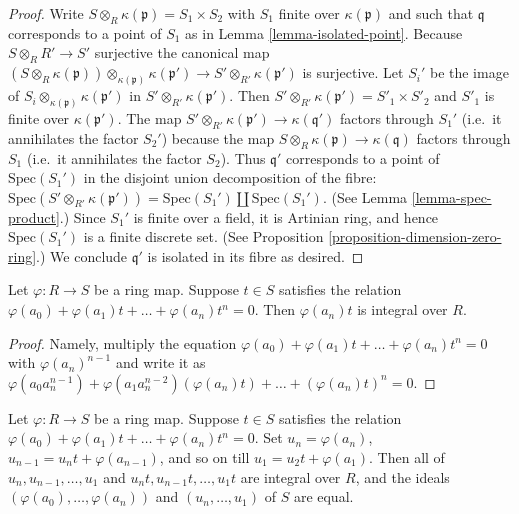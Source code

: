 \begin{proof}
Write $S \otimes_R \kappa(\mathfrak p) = S_1 \times S_2$
with $S_1$ finite over $\kappa(\mathfrak p)$ and such that
$\mathfrak q$ corresponds to a point of $S_1$ as in
Lemma \ref{lemma-isolated-point}.
Because $S \otimes_R R' \to S'$ surjective the canonical map
$(S \otimes_R \kappa(\mathfrak p)) \otimes_{\kappa(\mathfrak p)}
\kappa(\mathfrak p') \to S' \otimes_{R'} \kappa(\mathfrak p')$
is surjective. Let $S_i'$ be the image of $S_i \otimes_{\kappa(\mathfrak p)}
\kappa(\mathfrak p')$ in $S' \otimes_{R'} \kappa(\mathfrak p')$.
Then $S' \otimes_{R'} \kappa(\mathfrak p') =S'_1 \times
S'_2$ and $S'_1$ is finite over $\kappa(\mathfrak p')$.
The map $S' \otimes_{R'} \kappa(\mathfrak p') \to
\kappa(\mathfrak q')$ factors through $S_1'$
(i.e.\ it annihilates the factor $S_2'$) 
because the map $S\otimes_R \kappa(\mathfrak p) \to
\kappa(\mathfrak q)$ factors through $S_1$
(i.e.\ it annihilates the factor $S_2$). Thus
$\mathfrak q'$ corresponds to a point of
$\text{Spec}(S_1')$ in the disjoint union decomposition
of the fibre: $\text{Spec}(S' \otimes_{R'} \kappa(\mathfrak p'))
= \text{Spec}(S_1') \amalg \text{Spec}(S_1')$. (See
Lemma \ref{lemma-spec-product}.)
Since $S_1'$ is finite over a field, it is Artinian ring,
and hence $\text{Spec}(S_1')$ is a finite discrete set.
(See Proposition \ref{proposition-dimension-zero-ring}.)
We conclude $\mathfrak q'$ is isolated in its fibre as
desired.
\end{proof}

\begin{lemma}
\label{lemma-make-integral-trivial}
Let $\varphi : R \to S$ be a ring map.
Suppose $t \in S$ satisfies the
relation $\varphi(a_0) + \varphi(a_1)t + \ldots + \varphi(a_n) t^n = 0$.
Then $\varphi(a_n)t$ is integral over $R$.
\end{lemma}

\begin{proof}
Namely, multiply the equation 
$\varphi(a_0) + \varphi(a_1)t + \ldots + \varphi(a_n) t^n = 0$
with $\varphi(a_n)^{n-1}$ and write it as
$\varphi(a_0 a_n^{n-1}) + 
\varphi(a_1 a_n^{n-2}) (\varphi(a_n)t) +
\ldots +
(\varphi(a_n) t)^n = 0$.
\end{proof}

\begin{lemma}
\label{lemma-make-integral-less-trivial}
Let $\varphi : R \to S$ be a ring map.
Suppose $t \in S$ satisfies the
relation $\varphi(a_0) + \varphi(a_1)t + \ldots + \varphi(a_n) t^n = 0$.
Set $u_n = \varphi(a_n)$, $u_{n-1} = u_n t + \varphi(a_{n-1})$,
and so on till $u_1 = u_2 t + \varphi(a_1)$. 
Then all of $u_n, u_{n-1}, \ldots, u_1$ and
$u_nt, u_{n-1}t, \ldots, u_1t$ are integral over $R$,
and the ideals $(\varphi(a_0), \ldots, \varphi(a_n))$ and
$(u_n,\ldots, u_1)$ of $S$ are equal.
\end{lemma}


